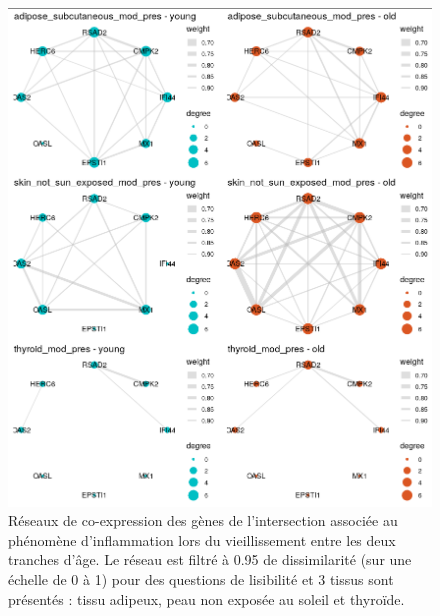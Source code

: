 \begin{figure}[p]
    \centering
    \includegraphics[width=1\textwidth]{img/chap2/chap2_graphs_intersection_plot_adipo_skinnosun_thyr.png}
    \caption{Réseaux de co-expression des gènes de l'intersection associée au phénomène d'inflammation lors du vieillissement entre les deux tranches d'âge. Le réseau est filtré à 0.95 de dissimilarité (sur une échelle de 0 à 1) pour des questions de lisibilité et 3 tissus sont présentés : tissu adipeux, peau non exposée au soleil et thyroïde.}
    \label{figure:graphs_intersection_plot_adipo_skinnosun_thyr}
\end{figure}

